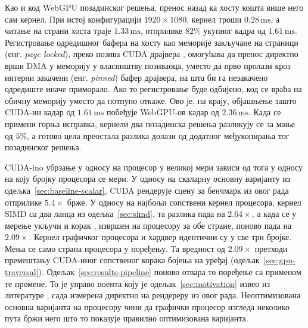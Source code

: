 \documentclass[serbian]{ftndiplomski}
\begin{document}
\noindent\begin{minipage}{\linewidth}

\end{minipage}

Као и код WebGPU позадинског решења, пренос назад ка хосту кошта више него сам
кернел. При истој конфигурацији $1920\times1080$, кернел троши $0.28\,\mathrm{ms}$, а
читање на страни хоста траје $1.33\,\mathrm{ms}$, отприлике $82\%$ укупног кадра од
$1.61\,\mathrm{ms}$. Регистровање одредишног бафера на хосту као меморије закључане на
страници (енг. \emph{page locked}), преко позива CUDA драјвера ,
омогућава да пренос директно врши DMA у меморију у власништву позиваоца, уместо да
прво пролази кроз интерни закачени (енг. \emph{pinned}) бафер драјвера, на шта би га
незакачено одредиште иначе приморало. Ако то регистровање буде одбијено, код се враћа
на обичну меморију уместо да потпуно откаже. Ово је, на крају, објашњење зашто
CUDA-ин кадар од $1.61\,\mathrm{ms}$ побеђује WebGPU-ов кадар од $2.36\,\mathrm{ms}$.
Када се примени горња исправка, кернели два позадинска решења разликују се за мање од
$5\%$, а готово цела преостала разлика долази од додатног међукопирања тог позадинског
решења.

CUDA-ino убрзање у односу на процесор у великој мери зависи од тога у односу на коју
бројку процесора се мери. У односу на скаларну  основну варијанту из
одељка~\ref{sec:baseline-scalar}, CUDA рендерује сцену за бенчмарк из овог рада
отприлике $5.4\times$ брже. У односу на најбољи сопствени кернел процесора, кернел
SIMD са два ланца  из одељка~\ref{sec:simd}, та разлика пада на $2.64\times$,
а када се у мерење укључи и корак , извршен на процесору за обе
стране, поново пада на $2.09\times$. Кернел графичког процесора и хардвер идентични су
у све три бројке. Мења се само страна процесора у поређењу. Та вредност од $2.09\times$
претходи премештању CUDA-иног сопственог корака бојења на уређај
(одељак~\ref{sec:gpu-traversal}). Одељак~\ref{sec:results-pipeline} поново отвара то
поређење са применом те промене. То је управо поента коју је одељак~\ref{sec:motivation}
извео из литературе \cite{lee2010debunking}, сада измерена директно на рендереру из
овог рада. Неоптимизована основна варијанта на процесору чини да графички процесор
изгледа неколико пута бржи него што то показује правилно оптимизована варијанта.
\end{document}
